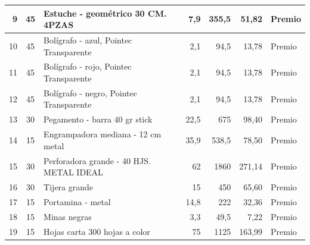 \documentclass{article}
\begin{document}
\begin{table}[htbp]
{\begin{tabular}{|cccc|r|r|r}
    \midrule
    \multicolumn{1}{|r|}{9} & \multicolumn{1}{c|}{45} & \multicolumn{1}{l|}{Estuche - geométrico 30 CM. 4PZAS} & \multicolumn{1}{r|}{7,9} & 355,5 & 51,82 & \multicolumn{1}{l|}{Premio} \\
    \midrule
    \multicolumn{1}{|r|}{10} & \multicolumn{1}{c|}{45} & \multicolumn{1}{l|}{Bolígrafo - azul, Pointec Transparente} & \multicolumn{1}{r|}{2,1} & 94,5  & 13,78 & \multicolumn{1}{l|}{Premio} \\
    \midrule
    \multicolumn{1}{|r|}{11} & \multicolumn{1}{c|}{45} & \multicolumn{1}{l|}{Bolígrafo - rojo, Pointec Transparente} & \multicolumn{1}{r|}{2,1} & 94,5  & 13,78 & \multicolumn{1}{l|}{Premio} \\
    \midrule
    \multicolumn{1}{|r|}{12} & \multicolumn{1}{c|}{45} & \multicolumn{1}{l|}{Bolígrafo - negro, Pointec Transparente} & \multicolumn{1}{r|}{2,1} & 94,5  & 13,78 & \multicolumn{1}{l|}{Premio} \\
    \midrule
    \multicolumn{1}{|r|}{13} & \multicolumn{1}{c|}{30} & \multicolumn{1}{l|}{Pegamento - barra 40 gr stick} & \multicolumn{1}{r|}{22,5} & 675   & 98,40 & \multicolumn{1}{l|}{Premio} \\
    \midrule
    \multicolumn{1}{|r|}{14} & \multicolumn{1}{c|}{15} & \multicolumn{1}{l|}{Engrampadora mediana - 12 cm metal } & \multicolumn{1}{r|}{35,9} & 538,5 & 78,50 & \multicolumn{1}{l|}{Premio} \\
    \midrule
    \multicolumn{1}{|r|}{15} & \multicolumn{1}{c|}{30} & \multicolumn{1}{l|}{Perforadora grande - 40 HJS. METAL IDEAL} & \multicolumn{1}{r|}{62} & 1860  & 271,14 & \multicolumn{1}{l|}{Premio} \\
    \midrule
    \multicolumn{1}{|r|}{16} & \multicolumn{1}{c|}{30} & \multicolumn{1}{l|}{Tijera grande} & \multicolumn{1}{r|}{15} & 450   & 65,60 & \multicolumn{1}{l|}{Premio} \\
    \midrule
    \multicolumn{1}{|r|}{17} & \multicolumn{1}{c|}{15} & \multicolumn{1}{l|}{Portamina - metal} & \multicolumn{1}{r|}{14,8} & 222   & 32,36 & \multicolumn{1}{l|}{Premio} \\
    \midrule
    \multicolumn{1}{|r|}{18} & \multicolumn{1}{c|}{15} & \multicolumn{1}{l|}{Minas negras} & \multicolumn{1}{r|}{3,3} & 49,5  & 7,22  & \multicolumn{1}{l|}{Premio} \\
    \midrule
    \multicolumn{1}{|r|}{19} & \multicolumn{1}{c|}{15} & \multicolumn{1}{l|}{Hojas carta 300 hojas a color} & \multicolumn{1}{r|}{75} & 1125  & 163,99 & \multicolumn{1}{l|}{Premio} \\

\end{tabular}}
\end{table}
\end{document}
